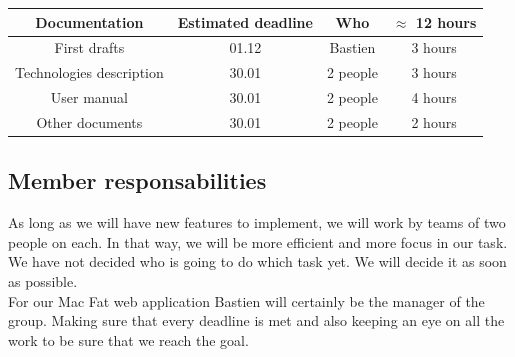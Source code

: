 \documentclass[12pt]{article}
\begin{document}
    \begin{center}
        \begin{tabular}{ |c|c|c|c| } 
            \hline
            \textbf{Documentation} & \textbf{Estimated deadline} & \textbf{Who} & \textbf{$\approx$ 12 hours} \\
            \hline
            First drafts & 01.12 & Bastien & 3 hours \\
            \hline
 	        Technologies description & 30.01 & 2 people & 3 hours\\  
            \hline
            User manual & 30.01 & 2 people & 4 hours \\
            \hline
            Other documents & 30.01 & 2 people & 2 hours \\
	        \hline
	    \end{tabular}
    \end{center}
    
    {\color{color_subsection}\subsection{Member responsabilities}}

    \noindent As long as we will have new features to implement, we will work by teams
    of two people on each. In that way, we will be more efficient and more
    focus in our task. We have not decided who is going to do which task yet.
    We will decide it as soon as possible.\\

    \noindent For our Mac Fat web application Bastien will certainly be the manager of
    the group. Making sure that every deadline is met and also keeping an eye 
    on all the work to be sure that we reach the goal.\\
\end{document}

